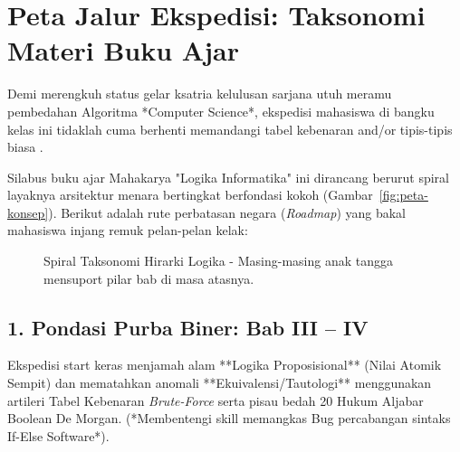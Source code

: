 \section{Peta Jalur Ekspedisi: Taksonomi Materi Buku Ajar}

Demi merengkuh status gelar ksatria kelulusan sarjana utuh meramu pembedahan Algoritma *Computer Science*, ekspedisi mahasiswa di bangku kelas ini tidaklah cuma berhenti memandangi tabel kebenaran and/or tipis-tipis biasa \cite{rosen2019,levin_discrete}. 

Silabus buku ajar Mahakarya "Logika Informatika" ini dirancang berurut spiral layaknya arsitektur menara bertingkat berfondasi kokoh (Gambar~\ref{fig:peta-konsep}). Berikut adalah rute perbatasan negara (\textit{Roadmap}) yang bakal mahasiswa injang remuk pelan-pelan kelak:

\begin{figure}[htbp]
\centering
{}
\caption{Spiral Taksonomi Hirarki Logika - Masing-masing anak tangga mensuport pilar bab di masa atasnya.}
\label{fig:peta-konsep-bab2}
\end{figure}

\subsection{1. Pondasi Purba Biner: Bab III -- IV}
Ekspedisi start keras menjamah alam **Logika Proposisional** (Nilai Atomik Sempit) dan mematahkan anomali **Ekuivalensi/Tautologi** menggunakan artileri Tabel Kebenaran \textit{Brute-Force} serta pisau bedah 20 Hukum Aljabar Boolean De Morgan. (*Membentengi skill memangkas Bug percabangan sintaks If-Else Software*).

